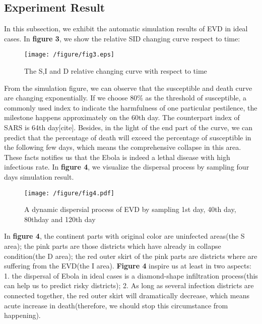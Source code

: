 \subsection{Experiment Result}
In this subsection, we exhibit the automatic simulation results of EVD in ideal cases. In \textbf{figure 3}, we show the relative SID changing curve respect to time:
\begin{figure}[htbp]
\centering
\texttt{[image: /figure/fig3.eps]}
\caption{The S,I and D relative changing curve with respect to time}\label{fig:3}
\end{figure}
From the simulation figure, we can observe that the susceptible and death curve are changing exponentially. If we choose 80\% as the threshold of susceptible, a commonly used index to indicate the harmfulness of one particular pestilence, the milestone happens approximately on the 60th day. The counterpart index of SARS is 64th day[cite]. Besides, in the light of the end part of the curve, we can predict that the percentage of death will exceed the percentage of susceptible in the following few days, which means the comprehensive collapse in this area. These facts notifies us that the Ebola is indeed a lethal disease with high infectious rate.
In \textbf{figure 4}, we visualize the dispersal process by sampling four days simulation result.
\begin{figure}[htbp]
\centering
\texttt{[image: /figure/fig4.pdf]}
\caption{A dynamic dispersial process of EVD by sampling 1st day, 40th day, 80thday and 120th day}\label{fig:4}
\end{figure}
In \textbf{figure 4}, the continent parts with original color are uninfected areas(the S area); the pink parts are those districts which have already in collapse condition(the D area); the red outer skirt of the pink parts are districts where are suffering from the EVD(the I area). \textbf{Figure 4} inspire us at least in two aspects: 1. the dispersal of Ebola in ideal cases is a diamond-shape infiltration process(this can help us to predict risky districts); 2. As long as several infection districts are connected together, the red outer skirt will dramatically decrease, which means acute increase in death(therefore, we should stop this circumstance from happening).
